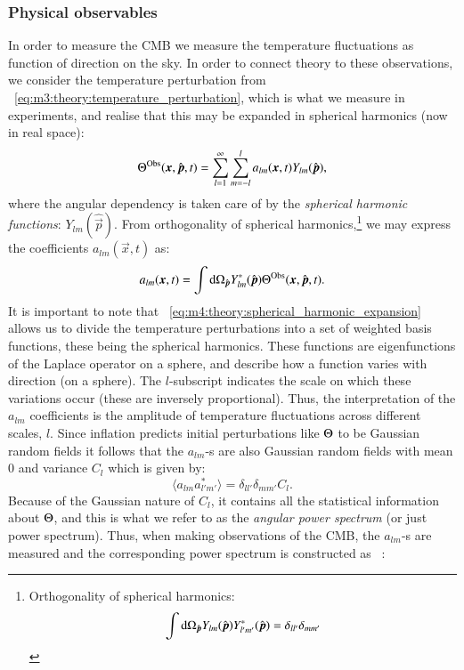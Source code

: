     \subsubsection{Physical observables}
        In order to measure the CMB we measure the temperature fluctuations as function of direction on the sky. In order to connect theory to these observations, we consider the temperature perturbation from ~\cref{eq:m3:theory:temperature_perturbation}, which is what we measure in experiments, and realise that this may be expanded in spherical harmonics (now in real space):
        \begin{equation}\label{eq:m4:theory:spherical_harmonic_expansion}
            \Theta^\mathrm{Obs}(\boldsymbol{x}, \hat{\boldsymbol{p}}, t) = \sum_{l=1}^\infty\sum_{m=-l}^l a_{lm}(\boldsymbol{x}, t)Y_{lm}(\hat{\boldsymbol{p}}),
        \end{equation}
        where the angular dependency is taken care of by the \textit{spherical harmonic functions}: $Y_{lm}(\hat{\vec{p}})$. From orthogonality of spherical harmonics,\footnote{Orthogonality of spherical harmonics:$$\int\mathrm{d}\Omega_{\hat{\boldsymbol{p}}}Y_{lm}(\hat{\boldsymbol{p}})Y^*_{l'm'}(\hat{\boldsymbol{p}}) = \delta_{ll'}\delta_{mm'}$$} we may express the coefficients $a_{lm}(\vec{x},t)$ as:
        \begin{equation}\label{eq:m4:theory:alm_coefficients}
            a_{lm}(\boldsymbol{x},t) = \int\mathrm{d}\Omega_{\hat{\boldsymbol{p}}}Y^*_{lm}(\hat{\boldsymbol{p}})\Theta^\mathrm{Obs}(\boldsymbol{x}, \hat{\boldsymbol{p}},t).
        \end{equation}
        It is important to note that ~\cref{eq:m4:theory:spherical_harmonic_expansion} allows us to divide the temperature perturbations into a set of weighted basis functions, these being the spherical harmonics. These functions are eigenfunctions of the Laplace operator on a sphere, and describe how a function varies with direction (on a sphere). The $l$-subscript indicates the scale on which these variations occur (these are inversely proportional). Thus, the interpretation of the $a_{lm}$ coefficients is the amplitude of temperature fluctuations across different scales, $l$. Since inflation predicts initial perturbations like $\Theta$ to be Gaussian random fields it follows that the $a_{lm}$-s are also Gaussian random fields with mean 0 and variance $C_l$ which is given by: 
        \begin{equation}\label{eq:m4:theory:alm_coeff_variance}
            \langle a_{lm}a^*_{l'm'}\rangle = \delta_{ll'}\delta_{mm'}C_l.
        \end{equation}
        Because of the Gaussian nature of $C_l$, it contains all the statistical information about $\Theta$, and this is what we refer to as the \textit{angular power spectrum} (or just power spectrum). Thus, when making observations of the CMB, the $a_{lm}$-s are measured and the corresponding power spectrum is constructed as ~\cite{AST5220LectureNotes}:
